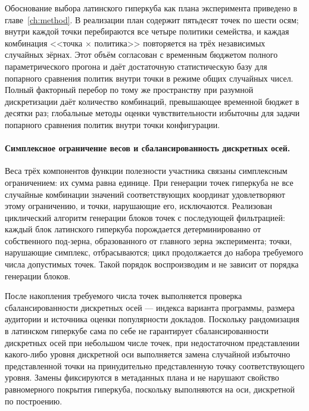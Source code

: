 Обоснование выбора латинского гиперкуба как плана эксперимента приведено в главе~\ref{ch:method}. В реализации план содержит пятьдесят точек по шести осям; внутри каждой точки перебираются все четыре политики семейства, и каждая комбинация <<точка $\times$ политика>> повторяется на трёх независимых случайных зёрнах. Этот объём согласован с временным бюджетом полного параметрического прогона и даёт достаточную статистическую базу для попарного сравнения политик внутри точки в режиме общих случайных чисел. Полный факторный перебор по тому же пространству при разумной дискретизации даёт количество комбинаций, превышающее временной бюджет в десятки раз; глобальные методы оценки чувствительности избыточны для задачи попарного сравнения политик внутри точки конфигурации.

\paragraph{Симплексное ограничение весов и сбалансированность дискретных осей.}
Веса трёх компонентов функции полезности участника связаны симплексным ограничением: их сумма равна единице. При генерации точек гиперкуба не все случайные комбинации значений соответствующих координат удовлетворяют этому ограничению, и точки, нарушающие его, исключаются. Реализован циклический алгоритм генерации блоков точек с последующей фильтрацией: каждый блок латинского гиперкуба порождается детерминированно от собственного под-зерна, образованного от главного зерна эксперимента; точки, нарушающие симплекс, отбрасываются; цикл продолжается до набора требуемого числа допустимых точек. Такой порядок воспроизводим и не зависит от порядка генерации блоков.

После накопления требуемого числа точек выполняется проверка сбалансированности дискретных осей --- индекса варианта программы, размера аудитории и источника оценки популярности докладов. Поскольку рандомизация в латинском гиперкубе сама по себе не гарантирует сбалансированности дискретных осей при небольшом числе точек, при недостаточном представлении какого-либо уровня дискретной оси выполняется замена случайной избыточно представленной точки на принудительно представленную точку соответствующего уровня. Замены фиксируются в метаданных плана и не нарушают свойство равномерного покрытия гиперкуба, поскольку выполняются на оси, дискретной по построению.

